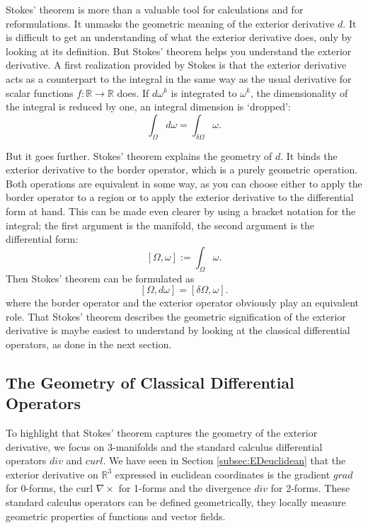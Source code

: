 Stokes' theorem is more than a  valuable tool for calculations and for reformulations. It unmasks the geometric meaning of the exterior derivative $d$. It is difficult to get an understanding of what the exterior derivative does, only by looking at its definition. But Stokes' theorem helps you understand the exterior derivative. 
A first realization provided by Stokes is that the exterior derivative acts as a counterpart to the integral in the same way as the usual derivative for scalar functions $f:\mathbb R \to \mathbb R$ does. If $d\omega^k$ is integrated to $\omega^k$, the dimensionality of the integral is reduced by one, an integral dimension is `dropped':
$$\int_{\Omega} d\omega = \int_{\delta \Omega} \omega.$$

But it goes further. Stokes' theorem explains the geometry of $d$. It binds the exterior derivative to the border operator, which is a purely geometric operation. Both operations are equivalent in some way, as you can choose either to apply the border operator to a region or to apply the exterior derivative to the differential form at hand.
This can be made even clearer by using a bracket notation for the integral; the first argument is the manifold, the second argument is the differential form:
\[[\Omega, \omega] := \int_{\Omega} \omega.\]
Then Stokes' theorem can be formulated as
\[[\Omega, d\omega] = [\delta \Omega, \omega].\]
where the border operator and the exterior operator obviously play an equivalent role. That Stokes' theorem describes the geometric signification of the exterior derivative is maybe easiest to understand by looking at the classical differential operators, as done in the next section.

\subsection{The Geometry of Classical Differential Operators}
\label{subsec:geometryCDO}
To highlight that Stokes' theorem captures the geometry of the exterior derivative, we focus on 3-manifolds and the standard calculus differential operators $div$ and $curl$. We have seen in Section \ref{subsec:EDeuclidean} that the exterior derivative on $\mathbb R^3$ expressed in euclidean coordinates is the gradient $grad$ for 0-forms, the curl $\nabla \times$ for 1-forms and the divergence $div$ for 2-forms.
These standard calculus operators can be defined geometrically, they locally measure geometric properties  of functions and vector fields.



